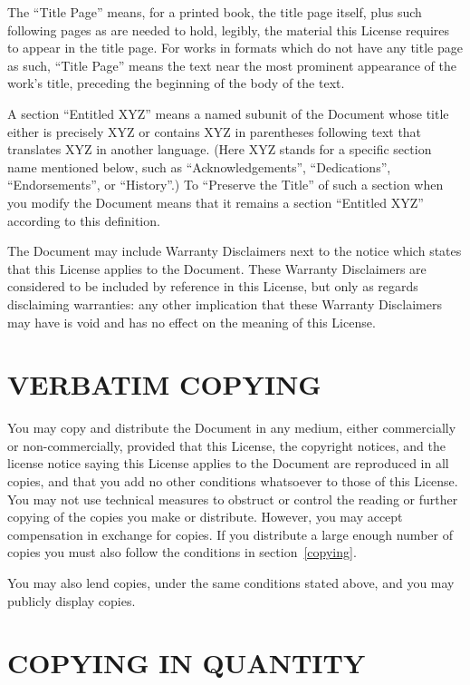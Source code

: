 \documentclass[10pt,a4paper,titlepage,twoside,openright]{report}
\begin{document}
The ``Title Page'' means, for a printed book, the title page itself,
plus such following pages as are needed to hold, legibly, the material
this License requires to appear in the title page.  For works in
formats which do not have any title page as such, ``Title Page'' means
the text near the most prominent appearance of the work's title,
preceding the beginning of the body of the text.

A section ``Entitled XYZ'' means a named subunit of the Document whose
title either is precisely XYZ or contains XYZ in parentheses following
text that translates XYZ in another language.  (Here XYZ stands for a
specific section name mentioned below, such as ``Acknowledgements'',
``Dedications'', ``Endorsements'', or ``History''.)  To ``Preserve the Title''
of such a section when you modify the Document means that it remains a
section ``Entitled XYZ'' according to this definition.

The Document may include Warranty Disclaimers next to the notice which
states that this License applies to the Document.  These Warranty
Disclaimers are considered to be included by reference in this
License, but only as regards disclaiming warranties: any other
implication that these Warranty Disclaimers may have is void and has
no effect on the meaning of this License.


\section*{VERBATIM COPYING}
\label{verbatim}

You may copy and distribute the Document in any medium, either
commercially or non-commercially, provided that this License, the
copyright notices, and the license notice saying this License applies
to the Document are reproduced in all copies, and that you add no other
conditions whatsoever to those of this License.  You may not use
technical measures to obstruct or control the reading or further
copying of the copies you make or distribute.  However, you may accept
compensation in exchange for copies.  If you distribute a large enough
number of copies you must also follow the conditions in
section~\ref{copying}.

You may also lend copies, under the same conditions stated above, and
you may publicly display copies.


\section*{COPYING IN QUANTITY}
\label{copying}
\end{document}
